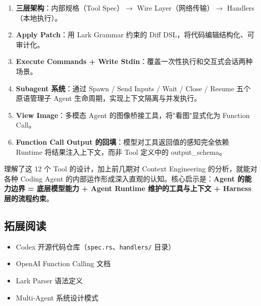 \documentclass[a4paper]{article}
\begin{document}
\begin{enumerate}
    \item \textbf{三层架构}：内部规格（Tool Spec）$\rightarrow$ Wire Layer（网络传输）$\rightarrow$ Handlers（本地执行）。
    \item \textbf{Apply Patch}：用 Lark Grammar 约束的 Diff DSL，将代码编辑结构化、可审计化。
    \item \textbf{Execute Commands + Write Stdin}：覆盖一次性执行和交互式会话两种场景。
    \item \textbf{Subagent 系统}：通过 Spawn / Send Inputs / Wait / Close / Resume 五个原语管理子 Agent 生命周期，实现上下文隔离与并发执行。
    \item \textbf{View Image}：多模态 Agent 的图像桥接工具，将"看图"显式化为 Function Call。
    \item \textbf{Function Call Output 的回填}：模型对工具返回值的感知完全依赖 Runtime 将结果注入上下文，而非 Tool 定义中的 output\_schema。
\end{enumerate}

理解了这 12 个 Tool 的设计，加上前几期对 Context Engineering 的分析，就能对各种 Coding Agent 的内部运作形成深入直观的认知。核心启示是：\textbf{Agent 的能力边界 = 底层模型能力 + Agent Runtime 维护的工具与上下文 + Harness 层的流程约束}。

\subsection{拓展阅读}

\begin{itemize}
    \item Codex 开源代码仓库（\texttt{spec.rs}、\texttt{handlers/} 目录）
    \item OpenAI Function Calling 文档
    \item Lark Parser 语法定义
    \item Multi-Agent 系统设计模式
\end{itemize}

\end{document}
